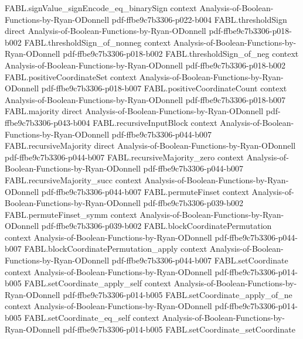 \begin{theorem}
\proofstep
  {FABL.signValue_signEncode_eq_binarySign}
  {context}
  {Analysis-of-Boolean-Functions-by-Ryan-ODonnell}
  {pdf-ffbe9c7b3306-p022-b004}
\proofstep
  {FABL.thresholdSign}
  {direct}
  {Analysis-of-Boolean-Functions-by-Ryan-ODonnell}
  {pdf-ffbe9c7b3306-p018-b002}
\proofstep
  {FABL.thresholdSign_of_nonneg}
  {context}
  {Analysis-of-Boolean-Functions-by-Ryan-ODonnell}
  {pdf-ffbe9c7b3306-p018-b002}
\proofstep
  {FABL.thresholdSign_of_neg}
  {context}
  {Analysis-of-Boolean-Functions-by-Ryan-ODonnell}
  {pdf-ffbe9c7b3306-p018-b002}
\proofstep
  {FABL.positiveCoordinateSet}
  {context}
  {Analysis-of-Boolean-Functions-by-Ryan-ODonnell}
  {pdf-ffbe9c7b3306-p018-b007}
\proofstep
  {FABL.positiveCoordinateCount}
  {context}
  {Analysis-of-Boolean-Functions-by-Ryan-ODonnell}
  {pdf-ffbe9c7b3306-p018-b007}
\proofstep
  {FABL.majority}
  {direct}
  {Analysis-of-Boolean-Functions-by-Ryan-ODonnell}
  {pdf-ffbe9c7b3306-p043-b004}
\proofstep
  {FABL.recursiveInputBlock}
  {context}
  {Analysis-of-Boolean-Functions-by-Ryan-ODonnell}
  {pdf-ffbe9c7b3306-p044-b007}
\proofstep
  {FABL.recursiveMajority}
  {direct}
  {Analysis-of-Boolean-Functions-by-Ryan-ODonnell}
  {pdf-ffbe9c7b3306-p044-b007}
\proofstep
  {FABL.recursiveMajority_zero}
  {context}
  {Analysis-of-Boolean-Functions-by-Ryan-ODonnell}
  {pdf-ffbe9c7b3306-p044-b007}
\proofstep
  {FABL.recursiveMajority_succ}
  {context}
  {Analysis-of-Boolean-Functions-by-Ryan-ODonnell}
  {pdf-ffbe9c7b3306-p044-b007}
\proofstep
  {FABL.permuteFinset}
  {context}
  {Analysis-of-Boolean-Functions-by-Ryan-ODonnell}
  {pdf-ffbe9c7b3306-p039-b002}
\proofstep
  {FABL.permuteFinset_symm}
  {context}
  {Analysis-of-Boolean-Functions-by-Ryan-ODonnell}
  {pdf-ffbe9c7b3306-p039-b002}
\proofstep
  {FABL.blockCoordinatePermutation}
  {context}
  {Analysis-of-Boolean-Functions-by-Ryan-ODonnell}
  {pdf-ffbe9c7b3306-p044-b007}
\proofstep
  {FABL.blockCoordinatePermutation_apply}
  {context}
  {Analysis-of-Boolean-Functions-by-Ryan-ODonnell}
  {pdf-ffbe9c7b3306-p044-b007}
\proofstep
  {FABL.setCoordinate}
  {context}
  {Analysis-of-Boolean-Functions-by-Ryan-ODonnell}
  {pdf-ffbe9c7b3306-p014-b005}
\proofstep
  {FABL.setCoordinate_apply_self}
  {context}
  {Analysis-of-Boolean-Functions-by-Ryan-ODonnell}
  {pdf-ffbe9c7b3306-p014-b005}
\proofstep
  {FABL.setCoordinate_apply_of_ne}
  {context}
  {Analysis-of-Boolean-Functions-by-Ryan-ODonnell}
  {pdf-ffbe9c7b3306-p014-b005}
\proofstep
  {FABL.setCoordinate_eq_self}
  {context}
  {Analysis-of-Boolean-Functions-by-Ryan-ODonnell}
  {pdf-ffbe9c7b3306-p014-b005}
\proofstep
  {FABL.setCoordinate_setCoordinate}

\end{theorem}
